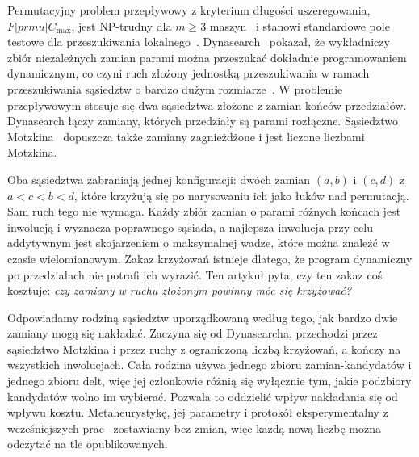 \documentclass[10pt,twocolumn]{article}
\begin{document}
Permutacyjny problem przepływowy z kryterium długości uszeregowania,
$F|prmu|C_{\max}$, jest NP-trudny dla $m\geq 3$
maszyn~\cite{garey1976} i stanowi standardowe pole testowe dla
przeszukiwania lokalnego~\cite{taillard1993,ruiz2007}. Dynasearch~\cite{congram2002}
pokazał, że wykładniczy zbiór niezależnych zamian parami można przeszukać
dokładnie programowaniem dynamicznym, co czyni ruch złożony jednostką
przeszukiwania w ramach przeszukiwania sąsiedztw o bardzo dużym
rozmiarze~\cite{ahuja2002}. W problemie przepływowym stosuje się dwa
sąsiedztwa złożone z zamian końców przedziałów. Dynasearch łączy zamiany,
których przedziały są parami rozłączne. Sąsiedztwo Motzkina~\cite{motzkin_own}
dopuszcza także zamiany zagnieżdżone i jest liczone liczbami Motzkina.

Oba sąsiedztwa zabraniają jednej konfiguracji: dwóch zamian $(a,b)$
i $(c,d)$ z $a<c<b<d$, które krzyżują się po narysowaniu ich jako łuków
nad permutacją. Sam ruch tego nie wymaga. Każdy zbiór zamian o parami
różnych końcach jest inwolucją i wyznacza poprawnego sąsiada, a najlepsza
inwolucja przy celu addytywnym jest skojarzeniem o maksymalnej wadze,
które można znaleźć w czasie wielomianowym. Zakaz krzyżowań istnieje
dlatego, że program dynamiczny po przedziałach nie potrafi ich wyrazić.
Ten artykuł pyta, czy ten zakaz coś kosztuje: \emph{czy zamiany w ruchu
złożonym powinny móc się krzyżować?}

Odpowiadamy rodziną sąsiedztw uporządkowaną według tego, jak bardzo dwie
zamiany mogą się nakładać. Zaczyna się od Dynasearcha, przechodzi przez
sąsiedztwo Motzkina i przez ruchy z ograniczoną liczbą krzyżowań, a kończy
na wszystkich inwolucjach. Cała rodzina używa jednego zbioru zamian-kandydatów
i jednego zbioru delt, więc jej członkowie różnią się wyłącznie tym, jakie
podzbiory kandydatów wolno im wybierać. Pozwala to oddzielić wpływ
nakładania się od wpływu kosztu. Metaheurystykę, jej parametry
i protokół eksperymentalny z wcześniejszych prac~\cite{motzkin_own,windowed_own}
zostawiamy bez zmian, więc każdą nową liczbę można odczytać na tle
opublikowanych.
\end{document}
